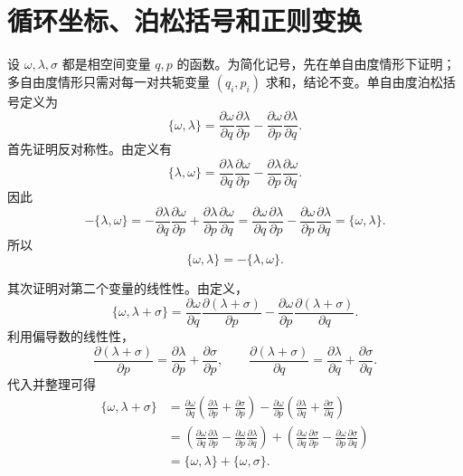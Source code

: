 ﻿%
\section{循环坐标、泊松括号和正则变换}

\begin{solution}[泊松括号]
\answer
设 \(\omega,\lambda,\sigma\) 都是相空间变量 \(q,p\) 的函数。为简化记号，先在单自由度情形下证明；多自由度情形只需对每一对共轭变量 \((q_i,p_i)\) 求和，结论不变。单自由度泊松括号定义为
\[
\{\omega,\lambda\}
=
\frac{\partial \omega}{\partial q}\frac{\partial \lambda}{\partial p}
-
\frac{\partial \omega}{\partial p}\frac{\partial \lambda}{\partial q}.
\]
首先证明反对称性。由定义有
\[
\{\lambda,\omega\}
=
\frac{\partial \lambda}{\partial q}\frac{\partial \omega}{\partial p}
-
\frac{\partial \lambda}{\partial p}\frac{\partial \omega}{\partial q}.
\]
因此
\[
-\{\lambda,\omega\}
=
-\frac{\partial \lambda}{\partial q}\frac{\partial \omega}{\partial p}
+
\frac{\partial \lambda}{\partial p}\frac{\partial \omega}{\partial q}
=
\frac{\partial \omega}{\partial q}\frac{\partial \lambda}{\partial p}
-
\frac{\partial \omega}{\partial p}\frac{\partial \lambda}{\partial q}
=
\{\omega,\lambda\}.
\]
所以
\[
\{\omega,\lambda\}=-\{\lambda,\omega\}.
\]

其次证明对第二个变量的线性性。由定义，
\[
\{\omega,\lambda+\sigma\}
=
\frac{\partial \omega}{\partial q}\frac{\partial(\lambda+\sigma)}{\partial p}
-
\frac{\partial \omega}{\partial p}\frac{\partial(\lambda+\sigma)}{\partial q}.
\]
利用偏导数的线性性，
\[
\frac{\partial(\lambda+\sigma)}{\partial p}
=
\frac{\partial\lambda}{\partial p}
+
\frac{\partial\sigma}{\partial p},
\qquad
\frac{\partial(\lambda+\sigma)}{\partial q}
=
\frac{\partial\lambda}{\partial q}
+
\frac{\partial\sigma}{\partial q}.
\]
代入并整理可得
\[
\begin{aligned}
\{\omega,\lambda+\sigma\}
&=
\frac{\partial \omega}{\partial q}
\left(
\frac{\partial\lambda}{\partial p}
+
\frac{\partial\sigma}{\partial p}
\right)
-
\frac{\partial \omega}{\partial p}
\left(
\frac{\partial\lambda}{\partial q}
+
\frac{\partial\sigma}{\partial q}
\right)\\
&=
\left(
\frac{\partial \omega}{\partial q}\frac{\partial\lambda}{\partial p}
-
\frac{\partial \omega}{\partial p}\frac{\partial\lambda}{\partial q}
\right)
+
\left(
\frac{\partial \omega}{\partial q}\frac{\partial\sigma}{\partial p}
-
\frac{\partial \omega}{\partial p}\frac{\partial\sigma}{\partial q}
\right)\\
&=
\{\omega,\lambda\}+\{\omega,\sigma\}.
\end{aligned}
\]


\end{solution}
